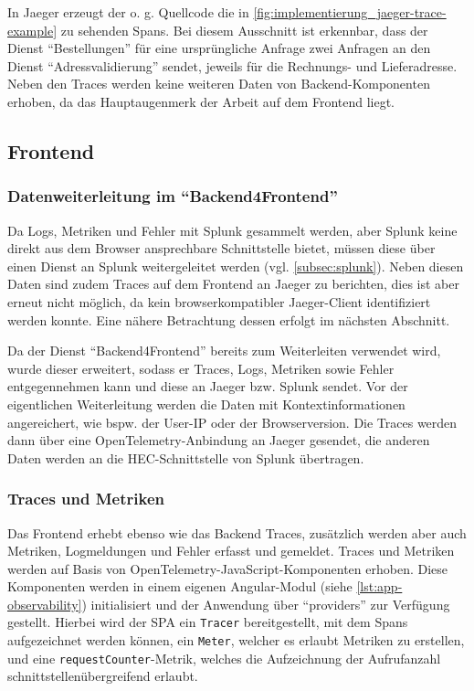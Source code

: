 In Jaeger erzeugt der o. g. Quellcode die in \autoref{fig:implementierung_jaeger-trace-example} zu sehenden Spans. Bei diesem Ausschnitt ist erkennbar, dass der Dienst \enquote{Bestellungen} für eine ursprüngliche Anfrage zwei Anfragen an den Dienst \enquote{Adressvalidierung} sendet, jeweils für die Rechnungs- und Lieferadresse. Neben den Traces werden keine weiteren Daten von Backend-Komponenten erhoben, da das Hauptaugenmerk der Arbeit auf dem Frontend liegt.

\subsection{Frontend}

\subsubsection{Datenweiterleitung im \enquote{Backend4Frontend}}



Da Logs, Metriken und Fehler mit Splunk gesammelt werden, aber Splunk keine direkt aus dem Browser ansprechbare Schnittstelle bietet, müssen diese über einen Dienst an Splunk weitergeleitet werden (vgl. \autoref{subsec:splunk}). Neben diesen Daten sind zudem Traces auf dem Frontend an Jaeger zu berichten, dies ist aber erneut nicht möglich, da kein browserkompatibler Jaeger-Client identifiziert werden konnte. Eine nähere Betrachtung dessen erfolgt im nächsten Abschnitt.

Da der Dienst \enquote{Backend4Frontend} bereits zum Weiterleiten verwendet wird, wurde dieser erweitert, sodass er Traces, Logs, Metriken sowie Fehler entgegennehmen kann und diese an Jaeger bzw. Splunk sendet. Vor der eigentlichen Weiterleitung werden die Daten mit Kontextinformationen angereichert, wie bspw. der User-IP oder der Browserversion. Die Traces werden dann über eine OpenTelemetry-Anbindung an Jaeger gesendet, die anderen Daten werden an die HEC-Schnittstelle \cite{SplunkHEC} von Splunk übertragen.

\subsubsection{Traces und Metriken}
\label{subsec:traces-und-metriken}

Das Frontend erhebt ebenso wie das Backend Traces, zusätzlich werden aber auch Metriken, Logmeldungen und Fehler erfasst und gemeldet. Traces und Metriken werden auf Basis von OpenTelemetry-JavaScript-Komponenten \cite{OpenTelemetryJS} erhoben. Diese Komponenten werden in einem eigenen Angular-Modul (siehe \autoref{lst:app-observability}) initialisiert und der Anwendung über \enquote{providers} zur Verfügung gestellt. Hierbei wird der SPA ein \texttt{Tracer} bereitgestellt, mit dem Spans aufgezeichnet werden können, ein \texttt{Meter}, welcher es erlaubt Metriken zu erstellen, und eine \texttt{requestCounter}-Metrik, welches die Aufzeichnung der Aufrufanzahl schnittstellenübergreifend erlaubt.

